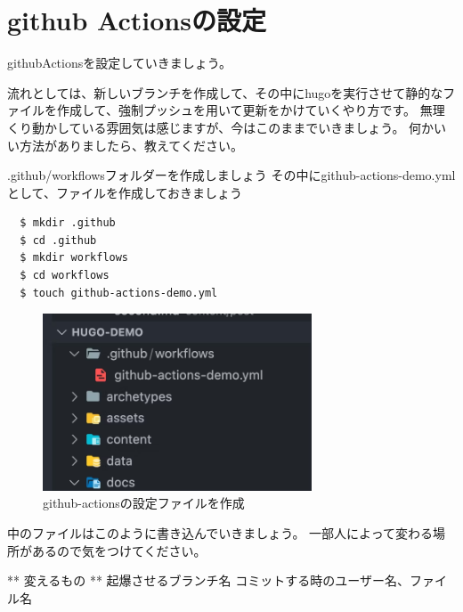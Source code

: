 \chapter{github Actionsの設定}

githubActionsを設定していきましょう。

流れとしては、新しいブランチを作成して、その中にhugoを実行させて静的なファイルを作成して、強制プッシュを用いて更新をかけていくやり方です。
無理くり動かしている雰囲気は感じますが、今はこのままでいきましょう。
何かいい方法がありましたら、教えてください。

.github/workflowsフォルダーを作成しましょう
その中にgithub-actions-demo.ymlとして、ファイルを作成しておきましょう

\begin{shaded}
  \begin{verbatim}
  $ mkdir .github
  $ cd .github
  $ mkdir workflows
  $ cd workflows
  $ touch github-actions-demo.yml
  \end{verbatim}
\end{shaded}

\begin{figure}[H]
  \centering
  \includegraphics[width=8cm]{./image/02-chap8/make-github-workflow.png}
  \caption{github-actionsの設定ファイルを作成 }
  \label{chap8-make-github-workflow-image}
\end{figure}

中のファイルはこのように書き込んでいきましょう。
一部人によって変わる場所があるので気をつけてください。

** 変えるもの **
起爆させるブランチ名 コミットする時のユーザー名、ファイル名


